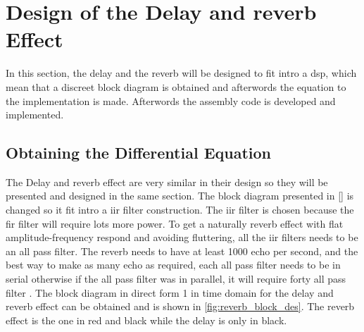 \section{Design of the Delay and \gls{reverb} Effect}
In this section, the delay and the \gls{reverb} will be designed to fit intro a \gls{dsp}, which mean that a discreet block diagram is obtained and afterwords the equation to the implementation is made. Afterwords the assembly code is developed and implemented. 


\subsection{Obtaining the Differential Equation}
The Delay and \gls{reverb} effect are very similar in their design so they will be presented and designed in the same section. The block diagram presented in \autoref{} is changed so it fit intro a \gls{iir} filter construction. The \gls{iir} filter is chosen because the \gls{fir} filter will require lots more power. To get a naturally \gls{reverb} effect with flat amplitude-frequency respond and avoiding fluttering, all the \gls{iir} filters needs to be an all pass filter. The \gls{reverb} needs to have at least 1000 echo per second, and the best way to make as many echo as required, each all pass filter needs to be in serial otherwise if the all pass filter was in parallel, it will require forty all pass filter \citep{natural_sounding_revorb}. The block diagram in direct form 1 in time domain for the delay and \gls{reverb} effect can be obtained and is shown in \autoref{fig:reverb_block_des}. The \gls{reverb} effect is the one in red and black while the delay is only in black. 


